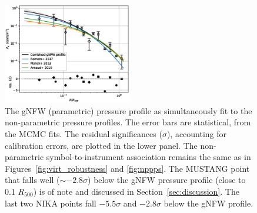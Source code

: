 \documentclass[twocolumn,traditabstract]{aa}
\begin{document}
\begin{figure}[!h]
  \centering
  \includegraphics[width=0.5\textwidth]{NIKA_ml_deproj_figs/Real_Joint_gNFW_Power_Real_11011111_2500S_500B_100W_gNFW_pressure_w_NP_pts_v2_p16cosmo.eps}
  \caption{The gNFW (parametric) pressure profile as simultaneously fit to the non-parametric pressure profiles.
    The error bars are statistical, from the MCMC fits. The residual significances ($\sigma$), accounting for calibration errors, are plotted
    in the lower panel.
    The non-parametric symbol-to-instrument association remains the same as in Figures~\ref{fig:virt_robustness} and \ref{fig:nppps}.
    The MUSTANG point that falls well ($\sim-2.8\sigma$) below the gNFW pressure profile (close to 0.1 $R_{500}$) is of
    note and discussed in Section~\ref{sec:discussion}. The last two NIKA points fall $-5.5\sigma$ and $-2.8\sigma$ below the gNFW
    profile.}
  \label{fig:joint_pressure}
\end{figure}

\end{document}

